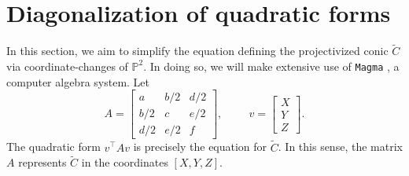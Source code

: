 \documentclass[10pt,a4paper]{amsart}
\numberwithin{equation}{section}
\numberwithin{figure}{section}
\numberwithin{table}{section}
\theoremstyle{definition}
\theoremstyle{plain}
\theoremstyle{remark}
\theoremstyle{plain}
\theoremstyle{definition}
\theoremstyle{plain}
\theoremstyle{plain}
\renewcommand{\P}{\mathbb{P}}
\newcommand{\trsp}[1]{{{#1}^{\top}\!\!}}
\begin{document}
	\section{Diagonalization of quadratic forms}
	\label{sec:diagonalizing-quadratic-forms} 
	
	In this section, we aim to simplify the equation defining the projectivized conic $\widetilde{C}$ via coordinate-changes of $\P^2$. In doing so,
	we will make extensive use of \texttt{Magma} \cite{magma}, a computer 
	algebra system. Let
	\begin{equation*}
	A=\begin{bmatrix}
	a&b/2&d/2\\
	b/2&c&e/2\\
	d/2&e/2&f
	\end{bmatrix}, \hspace{1cm}
	v = \begin{bmatrix}
	X\\
	Y\\
	Z
	\end{bmatrix}.
	\end{equation*}
	The quadratic form $\trsp{v} A v$ is precisely the equation for $\widetilde{C}$. In this sense, the matrix $A$ represents $\widetilde{C}$ in the coordinates $[X,Y,Z]$.
	
\end{document}
